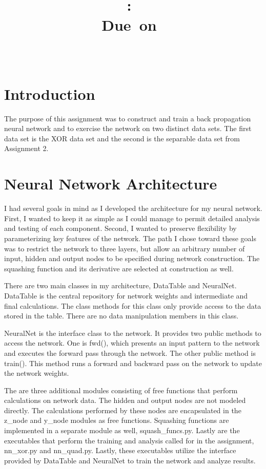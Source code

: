 \documentclass{article}
\title{\vspace{2in}\textmd{\textbf{\hmwkClass:\ \hmwkTitle\ifthenelse{\equal{\hmwkSubTitle}{}}{}{\\\hmwkSubTitle}}}\\\normalsize\vspace{0.1in}\small{Due\ on\ \hmwkDueDate}\\\vspace{0.1in}\large{\textit{\hmwkClassInstructor\ \hmwkClassTime}}\vspace{3in}}
\date{}
\author{\textbf{\hmwkAuthorName}}
\begin{document}
\maketitle

\section*{Introduction}
The purpose of this assignment was to construct and train a back
propagation neural network and to exercise the network on two distinct
data sets.  The first data set is the XOR data set and the second is
the separable data set from Assignment 2.

\section*{Neural Network Architecture}
I had several goals in mind as I developed the architecture for my
neural network.  First, I wanted to keep it as simple as I could manage
to permit detailed analysis and testing of each component.  Second, I
wanted to preserve flexibility by parameterizing key features of the
network.  The path I chose toward these goals was to restrict the
network to three layers, but allow an arbitrary number of
input, hidden and output nodes to be specified during network
construction. The squashing function and its derivative are selected
at construction as well.

There are two main classes in my architecture, DataTable and
NeuralNet. DataTable is the central repository for network weights and
intermediate and final calculations.  The class methods for this class
only provide access to the data stored in the table. There are no data
manipulation members in this class.

NeuralNet is the interface class to the network.  It provides two
public methods to access the network.  One is fwd(), which presents an
input pattern to the network and executes the forward pass through the
network. The other public method is train().  This method runs a
forward and backward pass on the network to update the network
weights.

The are three additional modules consisting of free functions that
perform calculations on network data.  The hidden and output nodes are
not modeled directly.  The calculations performed by these nodes are
encapsulated in the z\_node and y\_node modules as free functions.
Squashing functions are implemented in a separate module as well,
squash\_funcs.py.  Lastly are the executables that perform the
training and analysis called for in the assignment, nn\_xor.py and
nn\_quad.py.  Lastly, these executables utilize the interface provided
by DataTable and NeuralNet to train the network and analyze results.
\end{document}
